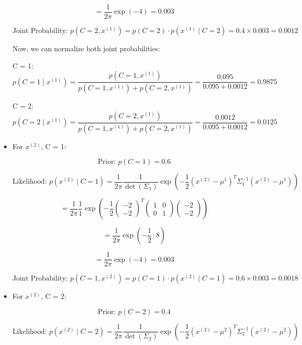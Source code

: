 \documentclass{article}
\begin{document}
\begin{itemize}
\[
= \frac{1}{2\pi} \exp(-4) = 0.003
\]

\[
\text{Joint Probability: } p(C = 2, x^{(1)}) = p(C = 2) \cdot p(x^{(1)} \mid C = 2) = 0.4 \times 0.003 = 0.0012
\]

Now, we can normalize both joint probabilities:

C = 1:
\[
p(C = 1 \mid x^{(1)}) = \frac{p(C = 1, x^{(1)})}{p(C = 1, x^{(1)}) + p(C = 2, x^{(1)})} = \frac{0.095}{0.095 + 0.0012} = 0.9875
\]

C = 2:
\[
p(C = 2 \mid x^{(1)}) = \frac{p(C = 2, x^{(1)})}{p(C = 1, x^{(1)}) + p(C = 2, x^{(1)})} = \frac{0.0012}{0.095 + 0.0012} = 0.0125
\]


\item[\textbullet] For \( x^{(2)} \), C = 1: 

\[
\text{Prior: } p(C = 1) = 0.6
\]

\[
\text{Likelihood: } p \left( x^{(2)} \mid C = 1 \right) = \frac{1}{2\pi} \frac{1}{\det(\Sigma_1)} \exp \left( -\frac{1}{2} \left( x^{(2)} - \mu^1 \right)^T \Sigma_1^{-1} \left( x^{(2)} - \mu^1 \right) \right)
\]

\[
= \frac{1}{2\pi} \frac{1}{1} \exp \left( -\frac{1}{2} \begin{pmatrix} -2 \\ -2 \end{pmatrix}^T \begin{pmatrix} 1 & 0 \\ 0 & 1 \end{pmatrix} \begin{pmatrix} -2 \\ -2 \end{pmatrix} \right)
\]

\[
= \frac{1}{2\pi} \exp \left( -\frac{1}{2} \cdot 8 \right) 
\]

\[
= \frac{1}{2\pi} \exp(-4) = 0.003
\]

\[
\text{Joint Probability: } p(C = 1, x^{(2)}) = p(C = 1) \cdot p(x^{(2)} \mid C = 1) = 0.6 \times 0.003 = 0.0018
\]

\newpage

 \item[\textbullet] For \( x^{(2)} \), C = 2: 

\[
\text{Prior: } p(C = 2) = 0.4
\]

\[
\text{Likelihood: } p \left( x^{(2)} \mid C = 2 \right) = \frac{1}{2\pi} \frac{1}{\det(\Sigma_2)} \exp \left( -\frac{1}{2} \left( x^{(2)} - \mu^2 \right)^T \Sigma_2^{-1} \left( x^{(2)} - \mu^2 \right) \right)
\]


\end{itemize}
\end{document}
